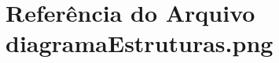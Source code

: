 \hypertarget{diagramaEstruturas_8png}{}\section{Referência do Arquivo diagrama\+Estruturas.\+png}
\label{diagramaEstruturas_8png}
